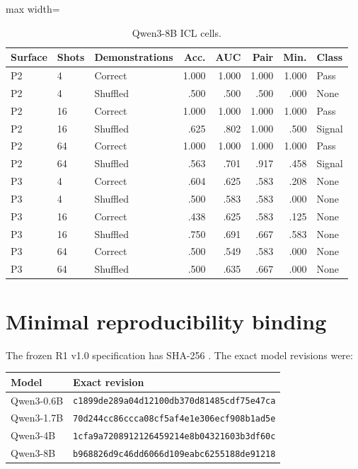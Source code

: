\documentclass[10pt,a4paper]{article}
\begin{document}
\begin{table}[H]
\centering
\caption{Qwen3-8B ICL cells.}
\begin{adjustbox}{max width=\textwidth}
\begin{tabular}{lllrrrrl}
\toprule
Surface & Shots & Demonstrations & Acc. & AUC & Pair & Min. & Class \\
\midrule
P2 & 4  & Correct  & 1.000 & 1.000 & 1.000 & 1.000 & Pass \\
P2 & 4  & Shuffled & .500 & .500 & .500 & .000 & None \\
P2 & 16 & Correct  & 1.000 & 1.000 & 1.000 & 1.000 & Pass \\
P2 & 16 & Shuffled & .625 & .802 & 1.000 & .500 & Signal \\
P2 & 64 & Correct  & 1.000 & 1.000 & 1.000 & 1.000 & Pass \\
P2 & 64 & Shuffled & .563 & .701 & .917 & .458 & Signal \\
P3 & 4  & Correct  & .604 & .625 & .583 & .208 & None \\
P3 & 4  & Shuffled & .500 & .583 & .583 & .000 & None \\
P3 & 16 & Correct  & .438 & .625 & .583 & .125 & None \\
P3 & 16 & Shuffled & .750 & .691 & .667 & .583 & None \\
P3 & 64 & Correct  & .500 & .549 & .583 & .000 & None \\
P3 & 64 & Shuffled & .500 & .635 & .667 & .000 & None \\
\bottomrule
\end{tabular}
\end{adjustbox}
\end{table}

\section{Minimal reproducibility binding}

The frozen R1 v1.0 specification has SHA-256
\texttt{}.
The exact model revisions were:

\begin{center}
\small
\begin{tabular}{@{}ll@{}}
\toprule
Model & Exact revision \\
\midrule
Qwen3-0.6B & \texttt{c1899de289a04d12100db370d81485cdf75e47ca} \\
Qwen3-1.7B & \texttt{70d244cc86ccca08cf5af4e1e306ecf908b1ad5e} \\
Qwen3-4B & \texttt{1cfa9a7208912126459214e8b04321603b3df60c} \\
Qwen3-8B & \texttt{b968826d9c46dd6066d109eabc6255188de91218} \\
\bottomrule
\end{tabular}
\end{center}
\end{document}
